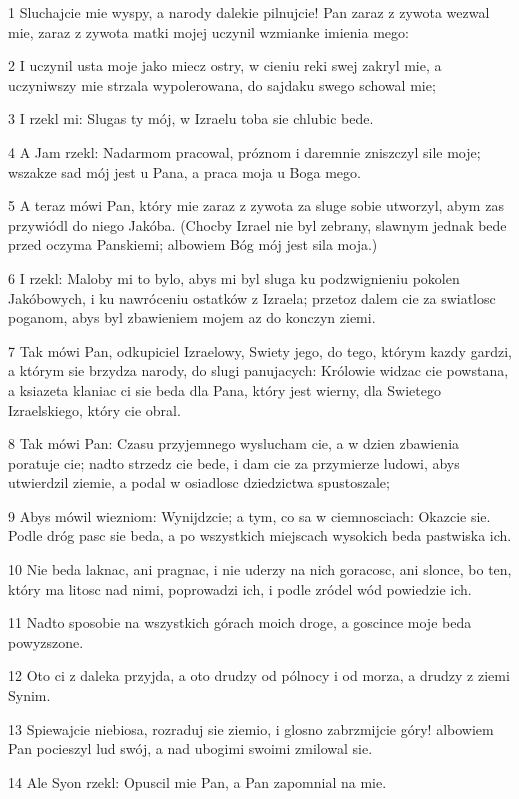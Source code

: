 \par 1 Sluchajcie mie wyspy, a narody dalekie pilnujcie! Pan zaraz z zywota wezwal mie, zaraz z zywota matki mojej uczynil wzmianke imienia mego:
\par 2 I uczynil usta moje jako miecz ostry, w cieniu reki swej zakryl mie, a uczyniwszy mie strzala wypolerowana, do sajdaku swego schowal mie;
\par 3 I rzekl mi: Slugas ty mój, w Izraelu toba sie chlubic bede.
\par 4 A Jam rzekl: Nadarmom pracowal, próznom i daremnie zniszczyl sile moje; wszakze sad mój jest u Pana, a praca moja u Boga mego.
\par 5 A teraz mówi Pan, który mie zaraz z zywota za sluge sobie utworzyl, abym zas przywiódl do niego Jakóba. (Chocby Izrael nie byl zebrany, slawnym jednak bede przed oczyma Panskiemi; albowiem Bóg mój jest sila moja.)
\par 6 I rzekl: Maloby mi to bylo, abys mi byl sluga ku podzwignieniu pokolen Jakóbowych, i ku nawróceniu ostatków z Izraela; przetoz dalem cie za swiatlosc poganom, abys byl zbawieniem mojem az do konczyn ziemi.
\par 7 Tak mówi Pan, odkupiciel Izraelowy, Swiety jego, do tego, którym kazdy gardzi, a którym sie brzydza narody, do slugi panujacych: Królowie widzac cie powstana, a ksiazeta klaniac ci sie beda dla Pana, który jest wierny, dla Swietego Izraelskiego, który cie obral.
\par 8 Tak mówi Pan: Czasu przyjemnego wyslucham cie, a w dzien zbawienia poratuje cie; nadto strzedz cie bede, i dam cie za przymierze ludowi, abys utwierdzil ziemie, a podal w osiadlosc dziedzictwa spustoszale;
\par 9 Abys mówil wiezniom: Wynijdzcie; a tym, co sa w ciemnosciach: Okazcie sie. Podle dróg pasc sie beda, a po wszystkich miejscach wysokich beda pastwiska ich.
\par 10 Nie beda laknac, ani pragnac, i nie uderzy na nich goracosc, ani slonce, bo ten, który ma litosc nad nimi, poprowadzi ich, i podle zródel wód powiedzie ich.
\par 11 Nadto sposobie na wszystkich górach moich droge, a goscince moje beda powyzszone.
\par 12 Oto ci z daleka przyjda, a oto drudzy od pólnocy i od morza, a drudzy z ziemi Synim.
\par 13 Spiewajcie niebiosa, rozraduj sie ziemio, i glosno zabrzmijcie góry! albowiem Pan pocieszyl lud swój, a nad ubogimi swoimi zmilowal sie.
\par 14 Ale Syon rzekl: Opuscil mie Pan, a Pan zapomnial na mie.
